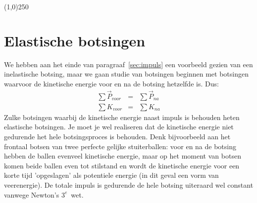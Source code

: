 \begin{center}
\line(1,0){250}
\end{center}

\section{Elastische botsingen}

We hebben aan het einde van paragraaf~\ref{sec:impuls}  een voorbeeld gezien
van een inelastische botsing, maar we gaan studie van botsingen beginnen met botsingen
waarvoor de kinetische energie voor en na de botsing hetzelfde is. Dus:
\begin{eqnarray}
\sum \vec{P}_{voor} & =  & \sum \vec{P}_{na} \\
\sum K_{voor} & = & \sum K_{na}
\end{eqnarray}
Zulke botsingen waarbij de kinetische energie naast impuls is behouden heten elastische
botsingen. Je moet je wel realiseren dat de kinetische energie niet gedurende het hele
botsingsproces is behouden. Denk bijvoorbeeld aan het frontaal botsen van twee perfecte gelijke 
stuiterballen: voor en na de botsing hebben de ballen evenveel kinetische energie, maar op het
moment van botsen komen beide ballen even tot stilstand en wordt de kinetische energie voor
een korte tijd 'opgeslagen' als potentiele energie (in dit geval een vorm van veerenergie). De 
totale impuls is gedurende de hele botsing uiteraard wel constant vanwege Newton's $3^e$~wet.
 
